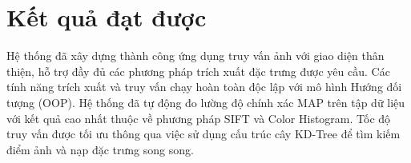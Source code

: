 \section{Kết quả đạt được}
Hệ thống đã xây dựng thành công ứng dụng truy vấn ảnh với giao diện thân thiện, hỗ trợ đầy đủ các phương pháp trích xuất đặc trưng được yêu cầu. Các tính năng trích xuất và truy vấn chạy hoàn toàn độc lập với mô hình Hướng đối tượng (OOP). Hệ thống đã tự động đo lường độ chính xác MAP trên tập dữ liệu với kết quả cao nhất thuộc về phương pháp SIFT và Color Histogram. Tốc độ truy vấn được tối ưu thông qua việc sử dụng cấu trúc cây KD-Tree để tìm kiếm điểm ảnh và nạp đặc trưng song song.
